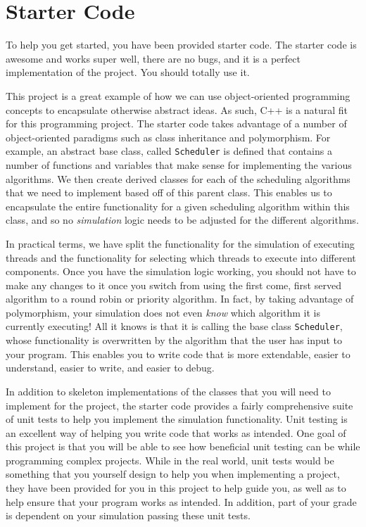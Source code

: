\documentclass[main.tex]{subfiles}
\begin{document}
\section{Starter Code}
\label{sec:starter-code}

To help you get started, you have been provided starter code. The starter code is awesome and works super well, there are no bugs, and it is a perfect implementation of the project. You should totally use it.

This project is a great example of how we can use object-oriented programming concepts to encapsulate otherwise abstract ideas. As such, C++ is a natural fit for this programming project. The starter code takes advantage of a number of object-oriented paradigms such as class inheritance and polymorphism. For example, an abstract base class, called \texttt{Scheduler} is defined that contains a number of functions and variables that make sense for implementing the various algorithms. We then create derived classes for each of the scheduling algorithms that we need to implement based off of this parent class. This enables us to encapsulate the entire functionality for a given scheduling algorithm within this class, and so no \emph{simulation} logic needs to be adjusted for the different algorithms.

In practical terms, we have split the functionality for the simulation of executing threads and the functionality for selecting which threads to execute into different components. Once you have the simulation logic working, you should not have to make any changes to it once you switch from using the first come, first served algorithm to a round robin or priority algorithm. In fact, by taking advantage of polymorphism, your simulation does not even \emph{know} which algorithm it is currently executing! All it knows is that it is calling the base class \texttt{Scheduler}, whose functionality is overwritten by the algorithm that the user has input to your program. This enables you to write code that is more extendable, easier to understand, easier to write, and easier to debug.

In addition to skeleton implementations of the classes that you will need to implement for the project, the starter code provides a fairly comprehensive suite of unit tests to help you implement the simulation functionality. Unit testing is an excellent way of helping you write code that works as intended. One goal of this project is that you will be able to see how beneficial unit testing can be while programming complex projects. While in the real world, unit tests would be something that you yourself design to help you when implementing a project, they have been provided for you in this project to help guide you, as well as to help ensure that your program works as intended. In addition, part of your grade is dependent on your simulation passing these unit tests.
\end{document}
